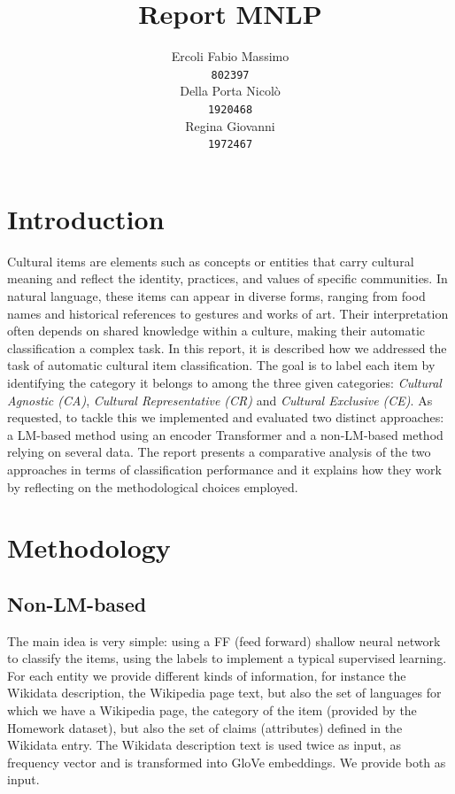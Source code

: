 \documentclass[11pt]{article}
\title{Report MNLP}
\author{Ercoli Fabio Massimo \\
\texttt{802397} \\\And
Della Porta Nicolò \\
\texttt{1920468} \\\And
Regina Giovanni \\
\texttt{1972467} \\}
\begin{document}
	\maketitle

	\section{Introduction}
	Cultural items are elements such as concepts or entities that carry cultural meaning and reflect the identity, practices, and values of specific communities. In natural language, these items can appear in diverse forms, ranging from food names and historical references to gestures and works of art. Their interpretation often depends on shared knowledge within a culture, making their automatic classification a complex task.
	In this report, it is described how we addressed the task of automatic cultural item classification. The goal is to label each item by identifying the category it belongs to among the three given categories: \textit{Cultural Agnostic (CA)}, \textit{Cultural Representative (CR)} and \textit{Cultural Exclusive (CE)}. As requested, to tackle this we implemented and evaluated two distinct approaches: a LM-based method using an encoder Transformer and a non-LM-based method relying on several data. The report presents a comparative analysis of the two approaches in terms of classification performance and it explains how they work by reflecting on the methodological choices employed.

	\section{Methodology}

	\subsection{Non-LM-based}
	The main idea is very simple: using a FF (feed forward) shallow neural network to classify the items, using the labels to implement a typical supervised learning. For each entity we provide different kinds of information, for instance the Wikidata description, the Wikipedia page text, but also the set of languages for which we have a Wikipedia page, the category of the item (provided by the Homework dataset), but also the set of claims (attributes) defined in the Wikidata entry.
	The Wikidata description text is used twice as input, as frequency vector and is transformed into GloVe embeddings. We provide both as input.
	
\end{document}
